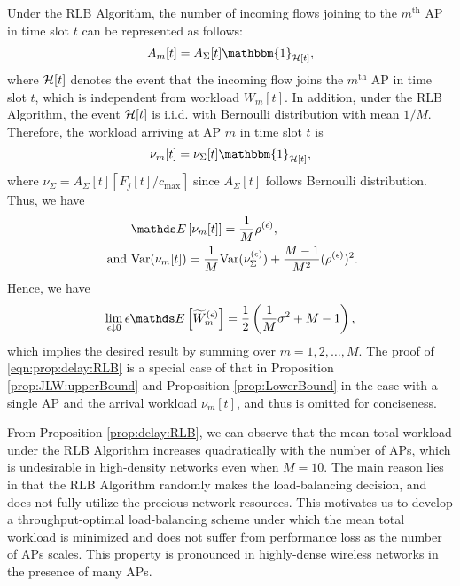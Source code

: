\documentclass[10pt, conference, letterpaper]{IEEEtran} %
\begin{document}
\begin{IEEEproof}
Under the RLB Algorithm, the number of incoming flows joining to the $m^{\text{th}}$ AP in time slot $t$ can be represented as follows:
\begin{align}
A_{m}[t]=A_{\Sigma}[t]\mathbbm{1}_{\mc{H}[t]},
\end{align}
where $\mathcal{H}[t]$ denotes the event that the incoming flow joins the $m^{\text{th}}$ AP in time slot $t$,  which is independent from workload $W_m[t]$. In addition, under the RLB Algorithm, the event $\mathcal{H}[t]$ is i.i.d. with Bernoulli distribution with mean $1/M$. Therefore, the workload arriving at AP $m$ in time slot $t$ is 
\begin{align}
\nu_{m}[t]=\nu_{\Sigma}[t]\mathbbm{1}_{\mc{H}[t]},
\end{align}
where $\nu_{\Sigma}=A_{\Sigma}[t]\left\lceil F_j[t]/c_{\max}\right\rceil$ since $A_{\Sigma}[t]$ follows Bernoulli distribution. Thus, we have 
\begin{align}
&\bE\left[\nu_m[t]\right]=\frac{1}{M}\rho^{(\epsilon)}, \nonumber\\
\text{ and }& \text{Var}(\nu_m[t])=\frac{1}{M}\text{Var}(\nu_{\Sigma}^{(\epsilon)})+\frac{M-1}{M^2}(\rho^{(\epsilon)})^2.
\end{align}
Hence, we have 
\begin{align}
\label{eqn:prop:delay:RLB}
\lim_{\epsilon\downarrow0}\epsilon\bE\left[\wt{W}_m^{(\epsilon)}\right]=\frac{1}{2}\left(\frac{1}{M}\sigma^2+M-1\right),
\end{align}
which implies the desired result by summing over $m=1,2,\ldots,M$. The proof of \eqref{eqn:prop:delay:RLB} is a special case of that in Proposition \ref{prop:JLW:upperBound} and Proposition \ref{prop:LowerBound} in the case with a single AP and the arrival workload $\nu_{m}[t]$, and thus is omitted for conciseness.
\end{IEEEproof}



From Proposition \ref{prop:delay:RLB}, we can observe that the mean total workload under the RLB Algorithm increases quadratically with the number of APs, which is undesirable in high-density networks even when $M=10$. The main reason lies in that the RLB Algorithm randomly makes the load-balancing decision, and does not fully utilize the precious network resources. This motivates us to develop a throughput-optimal load-balancing scheme under which the mean total workload is minimized and does not suffer from performance loss as the number of APs scales. This property is pronounced in highly-dense wireless networks in the presence of many APs.
\end{document}
